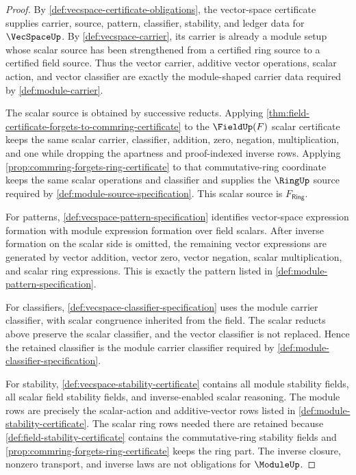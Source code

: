 \begin{proof}
By \autoref{def:vecspace-certificate-obligations}, the vector-space certificate supplies carrier, source, pattern, classifier, stability, and ledger data for $\VecSpaceUp$. By \autoref{def:vecspace-carrier}, its carrier is already a module setup whose scalar source has been strengthened from a certified ring source to a certified field source. Thus the vector carrier, additive vector operations, scalar action, and vector classifier are exactly the module-shaped carrier data required by \autoref{def:module-carrier}.

The scalar source is obtained by successive reducts. Applying \autoref{thm:field-certificate-forgets-to-commring-certificate} to the $\FieldUp(F)$ scalar certificate keeps the same scalar carrier, classifier, addition, zero, negation, multiplication, and one while dropping the apartness and proof-indexed inverse rows. Applying \autoref{prop:commring-forgets-ring-certificate} to that commutative-ring coordinate keeps the same scalar operations and classifier and supplies the $\RingUp$ source required by \autoref{def:module-source-specification}. This scalar source is $F_{\mathsf{Ring}}$.

For patterns, \autoref{def:vecspace-pattern-specification} identifies vector-space expression formation with module expression formation over field scalars. After inverse formation on the scalar side is omitted, the remaining vector expressions are generated by vector addition, vector zero, vector negation, scalar multiplication, and scalar ring expressions. This is exactly the pattern listed in \autoref{def:module-pattern-specification}.

For classifiers, \autoref{def:vecspace-classifier-specification} uses the module carrier classifier, with scalar congruence inherited from the field. The scalar reducts above preserve the scalar classifier, and the vector classifier is not replaced. Hence the retained classifier is the module carrier classifier required by \autoref{def:module-classifier-specification}.

For stability, \autoref{def:vecspace-stability-certificate} contains all module stability fields, all scalar field stability fields, and inverse-enabled scalar reasoning. The module rows are precisely the scalar-action and additive-vector rows listed in \autoref{def:module-stability-certificate}. The scalar ring rows needed there are retained because \autoref{def:field-stability-certificate} contains the commutative-ring stability fields and \autoref{prop:commring-forgets-ring-certificate} keeps the ring part. The inverse closure, nonzero transport, and inverse laws are not obligations for $\ModuleUp$.


\end{proof}
